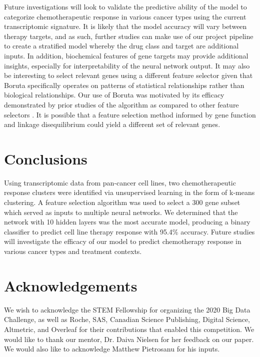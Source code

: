 \documentclass[10pt, letterpaper]{article}
\begin{document}
\begin{multicols*}{2}
Future investigations will look to validate the predictive ability of the model to categorize chemotherapeutic response in various cancer types using the current transcriptomic signature. It is likely that the model accuracy will vary between therapy targets, and as such, further studies can make use of our project pipeline to create a stratified model whereby the drug class and target are additional inputs. In addition, biochemical features of gene targets may provide additional insights, especially for interpretability of the neural network output. It may also be interesting to select relevant genes using a different feature selector given that Boruta specifically operates on patterns of statistical relationships rather than biological relationships. Our use of Boruta was motivated by its efficacy demonstrated by prior studies of the algorithm as compared to other feature selectors \cite{boruta, deep_cell}. It is possible that a feature selection method informed by gene function and linkage disequilibrium could yield a different set of relevant genes.


\section{Conclusions}
Using transcriptomic data from pan-cancer cell lines, two chemotherapeutic response clusters were identified via unsupervised learning in the form of k-means clustering. A feature selection algorithm was used to select a 300 gene subset which served as inputs to multiple neural networks. We determined that the network with 10 hidden layers was the most accurate model, producing a binary classifier to predict cell line therapy response with 95.4\% accuracy. Future studies will investigate the efficacy of our model to predict chemotherapy response in various cancer types and treatment contexts.


\section*{Acknowledgements}
We wish to acknowledge the STEM Fellowship for organizing the 2020 Big Data Challenge, as well as Roche, SAS, Canadian Science Publishing, Digital Science, Altmetric, and Overleaf for their contributions that enabled this competition. We would like to thank our mentor, Dr. Daiva Nielsen for her feedback on our paper. We would also like to acknowledge Matthew Pietrosanu for his inputs.




\end{multicols*}
\end{document}
